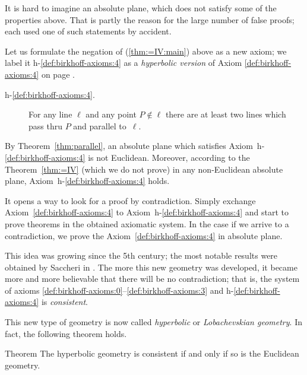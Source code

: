 It is hard to imagine an absolute plane, which does not satisfy some of the properties above.
That is partly the reason for the large number of false proofs;
each used one of such statements by accident.

Let us formulate the negation of (\ref{thm:=IV:main}) above as a new axiom;
we label it h-$\!$\ref{def:birkhoff-axioms:4} as a \emph{hyperbolic version} of Axiom \ref{def:birkhoff-axioms:4} on page \pageref{def:birkhoff-axioms:4}.


\begin{framed}
\begin{description}
\item[{\rm h-$\!$\ref{def:birkhoff-axioms:4}.}]\label{def:hyperbolic-4a}  
For any line $\ell$ and any point $P\notin\ell$ 
there are at least two lines which pass thru $P$ 
and parallel to~$\ell$.
\end{description}
\end{framed}

By Theorem~\ref{thm:parallel}, an absolute plane which satisfies Axiom~h-$\!$\ref{def:birkhoff-axioms:4} is not Euclidean. 
Moreover, according to the Theorem~\ref{thm:=IV} (which we do not prove) 
in any non-Euclidean absolute plane, Axiom~h-$\!$\ref{def:birkhoff-axioms:4} holds.

It opens a way to look for a proof by contradiction.
Simply exchange  Axiom~\ref{def:birkhoff-axioms:4} to Axiom~h-$\!$\ref{def:birkhoff-axioms:4}
 and start to prove theorems in the obtained axiomatic system.
In the case if we arrive to a contradiction, 
we prove the Axiom~\ref{def:birkhoff-axioms:4} in absolute plane.  

This idea was growing since the 5th century;
the most notable results were obtained by Saccheri in \cite{saccheri}.
The more this new geometry was developed,
it became more and more believable that there will be no contradiction;
that is, the system of axioms \ref{def:birkhoff-axioms:0}--\ref{def:birkhoff-axioms:3} and h-$\!$\ref{def:birkhoff-axioms:4} is \emph{consistent}.

This new type of geometry is now called \emph{hyperbolic} or  \emph{Lobachevskian geometry}.
In fact, the following theorem holds.

\begin{thm}{Theorem}\label{thm:consistent}
The hyperbolic geometry is consistent if and only if so is the Euclidean geometry.
\end{thm}


